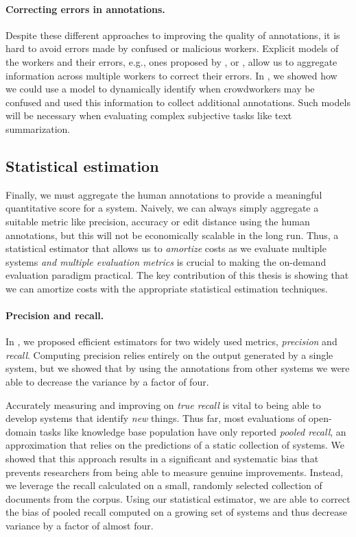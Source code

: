 \paragraph{Correcting errors in annotations.}
Despite these different approaches to improving the quality of annotations, it is hard to avoid errors made by confused or malicious workers.
Explicit models of the workers and their errors, e.g., ones proposed by \citet{dawid1979maximum}, \citet{passonneau2014benefits} or \citet{branson2017lean}, allow us to aggregate information across multiple workers to correct their errors.
In , we showed how we could use a model to dynamically identify when crowdworkers may be confused and used this information to collect additional annotations.
Such models will be necessary when evaluating complex subjective tasks like text summarization.

\subsection{Statistical estimation}
Finally, we must aggregate the human annotations to provide a meaningful quantitative score for a system.
Naively, we can always simply aggregate a suitable metric like precision, accuracy or edit distance using the human annotations, but this will not be economically scalable in the long run.
Thus, a statistical estimator that allows us to \textit{amortize} costs as we evaluate multiple systems \textit{and multiple evaluation metrics} is crucial to making the on-demand evaluation paradigm practical.
The key contribution of this thesis is showing that we can amortize costs with the appropriate statistical estimation techniques.

\paragraph{Precision and recall.}
In , we proposed efficient estimators for two widely used metrics, \textit{precision} and \textit{recall}.
Computing precision relies entirely on the output generated by a single system, but we showed that by using the annotations from other systems we were able to decrease the variance by a factor of four.

Accurately measuring and improving on \textit{true recall} is vital to being able to develop systems that identify \textit{new} things.
Thus far, most evaluations of open-domain tasks like knowledge base population have only reported \textit{pooled recall}, an approximation that relies on the predictions of a static collection of systems.
We showed that this approach results in a significant and systematic bias that prevents researchers from being able to measure genuine improvements.  
Instead, we leverage the recall calculated on a small, randomly selected collection of documents from the corpus.
Using our statistical estimator, we are able to correct the bias of pooled recall computed on a growing set of systems and thus decrease variance by a factor of almost four.

